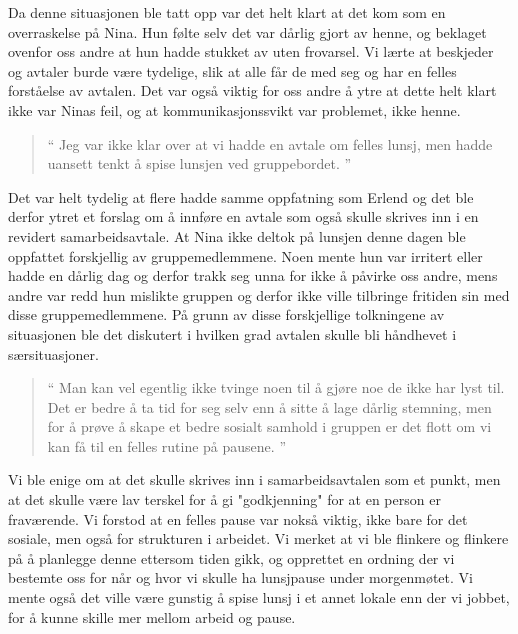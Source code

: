 Da denne situasjonen ble tatt opp var det helt klart at det kom som en overraskelse på Nina. Hun følte selv det var dårlig gjort av henne, og beklaget ovenfor oss andre at hun hadde stukket av uten frovarsel. Vi lærte at beskjeder og avtaler burde være tydelige, slik at alle får de med seg og har en felles forståelse av avtalen. Det var også viktig for oss andre å ytre at dette helt klart ikke var Ninas feil, og at kommunikasjonssvikt var problemet, ikke henne. 

\begin{quote}``
Jeg var ikke klar over at vi hadde en avtale om felles lunsj, men hadde uansett tenkt å spise lunsjen ved gruppebordet.
''\end{quote} 

Det var helt tydelig at flere hadde samme oppfatning som Erlend og det ble derfor ytret et forslag om å innføre en avtale som også skulle skrives inn i en revidert samarbeidsavtale. At Nina ikke deltok på lunsjen denne dagen ble oppfattet forskjellig av gruppemedlemmene. Noen mente hun var irritert eller hadde en dårlig dag og derfor trakk seg unna for ikke å påvirke oss andre, mens andre var redd hun mislikte gruppen og derfor ikke ville tilbringe fritiden sin med disse gruppemedlemmene. På grunn av disse forskjellige tolkningene av situasjonen ble det diskutert i hvilken grad avtalen skulle bli håndhevet i særsituasjoner. 

\begin{quote}``
Man kan vel egentlig ikke tvinge noen til å gjøre noe de ikke har lyst til. Det er bedre å ta tid for seg selv enn å sitte å lage dårlig stemning, men for å prøve å skape et bedre sosialt samhold i gruppen er det flott om vi kan få til en felles rutine på pausene.
''\end{quote} 

Vi ble enige om at det skulle skrives inn i samarbeidsavtalen som et punkt, men at det skulle være lav terskel for å gi "godkjenning" for at en person er fraværende. Vi forstod at en felles pause var nokså viktig, ikke bare for det sosiale, men også for strukturen i arbeidet. Vi merket at vi ble flinkere og flinkere på å planlegge denne ettersom tiden gikk, og opprettet en ordning der vi bestemte oss for når og hvor vi skulle ha lunsjpause under morgenmøtet. Vi mente også det ville være gunstig å spise lunsj i et annet lokale enn der vi jobbet, for å kunne skille mer mellom arbeid og pause.


